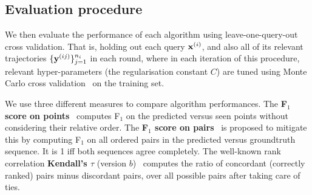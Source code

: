 \secmoveup
\subsection{Evaluation procedure}
\textmoveup

We then evaluate the performance of each algorithm using leave-one-query-out cross validation. 
That is, holding out each query $\mathbf{x}^{({i})}$, and also all of its relevant trajectories $\{\mathbf{y}^{({ij})}\}_{j=1}^{n_i}$ in each round,
where in each iteration of this procedure,
relevant hyper-parameters (\eg the regularisation constant $C$) are tuned using Monte Carlo cross validation~\cite{burman1989comparative} on the training set.

We use three different measures to compare algorithm performances.
The {\bf F$_1$ score on points}~\cite{ijcai15} computes F$_1$ on the predicted versus seen points
without considering their relative order.
The {\bf F$_1$ score on pairs}~\cite{cikm16paper} is proposed to mitigate this by computing F$_1$ on all ordered pairs in the predicted versus groundtruth sequence. It is 1 iff both sequences agree completely.
The well-known rank correlation {\bf Kendall's $\tau$} (version $b$)~\cite{agresti2010analysis} 
computes the ratio of concordant (correctly ranked) pairs minus discordant pairs, over all possible pairs after taking care of ties.


